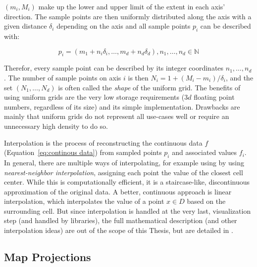 $(m_i, M_i)$  make up the lower and upper limit of the extent in each axis' direction. 
The sample points are then uniformly distributed along the axis with a given distance $\delta_i$ depending on the axis and all sample points $p_i$ can be described with: 

\begin{equation}
  p_i = (m_1 + n_i\delta_i,\dots, m_d + n_d\delta_d), n_1, \dots, n_d \in \mathbb{N}
  \label{eq:smaple point uniform grid}
\end{equation}

Therefor, every sample point can be described by its integer coordinates $n_1, \dots, n_d$. 
The number of sample points on axis $i$ is then $N_i = 1 + (M_i - m_i)/\delta_i$, and the set $(N_1, \dots, N_d)$ is often called the \textit{shape} of the uniform grid.   
The benefits of using uniform grids are the very low storage requirements ($3d$ floating point numbers, regardless of its size) and its simple implementation. 
Drawbacks are mainly that uniform grids do not represent all use-cases well or require an unnecessary high density to do so. 


Interpolation is the process of reconstructing the continuous data $f$ (Equation~\ref{eq:continous data}) from sampled points $p_i$ and associated values $f_i$. 
In general, there are multiple ways of interpolating, for example using by using \textit{nearest-neighbor interpolation}, assigning each point the value of the closest cell center. 
While this is computationally efficient, it is a staircase-like, discontinuous approximation of the original data. 
A better, continuous approach is linear interpolation, which interpolates the value of a point $x \in D$ based on the surrounding cell. 
But since interpolation is handled at the very last, visualization step (and handled by libraries), the full mathematical description (and other interpolation ideas) are out of the scope of this Thesis, but are detailed in . 

\subsection{Map Projections}

